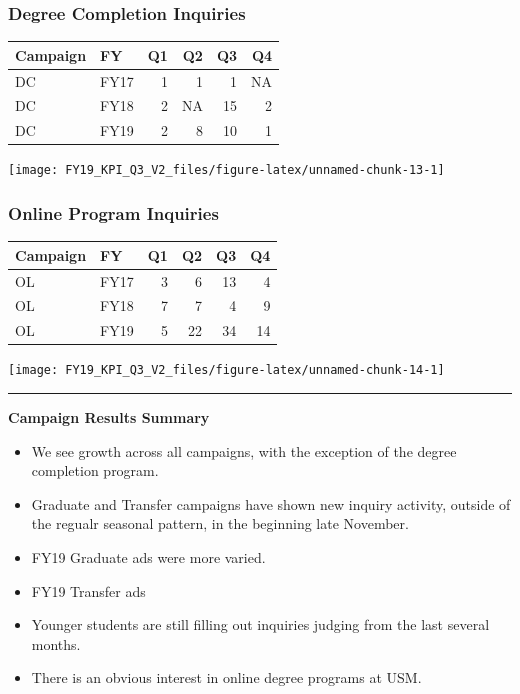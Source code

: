 \documentclass[]{tufte-handout}
\begin{document}
\subsubsection{Degree Completion
Inquiries}\label{degree-completion-inquiries}

\begin{longtable}[]{@{}llrrrr@{}}
\toprule
Campaign & FY & Q1 & Q2 & Q3 & Q4\tabularnewline
\midrule
\endhead
DC & FY17 & 1 & 1 & 1 & NA\tabularnewline
DC & FY18 & 2 & NA & 15 & 2\tabularnewline
DC & FY19 & 2 & 8 & 10 & 1\tabularnewline
\bottomrule
\end{longtable}

\texttt{[image: FY19\_KPI\_Q3\_V2\_files/figure-latex/unnamed-chunk-13-1]}

\subsubsection{Online Program Inquiries}\label{online-program-inquiries}

\begin{longtable}[]{@{}llrrrr@{}}
\toprule
Campaign & FY & Q1 & Q2 & Q3 & Q4\tabularnewline
\midrule
\endhead
OL & FY17 & 3 & 6 & 13 & 4\tabularnewline
OL & FY18 & 7 & 7 & 4 & 9\tabularnewline
OL & FY19 & 5 & 22 & 34 & 14\tabularnewline
\bottomrule
\end{longtable}

\texttt{[image: FY19\_KPI\_Q3\_V2\_files/figure-latex/unnamed-chunk-14-1]}

\begin{center}\rule{0.5\linewidth}{\linethickness}\end{center}

\textbf{Campaign Results Summary}

\begin{itemize}
\item
  We see growth across all campaigns, with the exception of the degree
  completion program.
\item
  Graduate and Transfer campaigns have shown new inquiry activity,
  outside of the regualr seasonal pattern, in the beginning late
  November.
\item
  FY19 Graduate ads were more varied.
\item
  FY19 Transfer ads
\item
  Younger students are still filling out inquiries judging from the last
  several months.
\item
  There is an obvious interest in online degree programs at USM.
\end{itemize}
\end{document}
